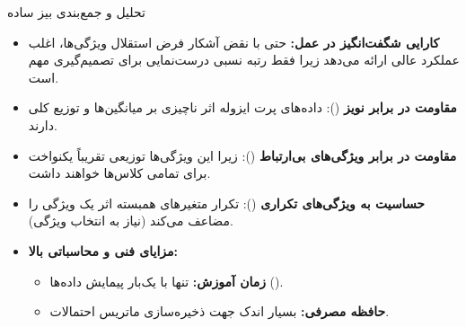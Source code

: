 \begin{frame}{تحلیل و جمع‌بندی بیز ساده}{}
  \begin{itemize}
    \setlength{\itemsep}{7pt}
    \item \textbf{کارایی شگفت‌انگیز در عمل:} حتی با نقض آشکار فرض استقلال ویژگی‌ها، اغلب عملکرد عالی ارائه می‌دهد زیرا فقط رتبه نسبی درست‌نمایی برای تصمیم‌گیری مهم است.
    \item \textbf{مقاومت در برابر نویز} (): داده‌های پرت ایزوله اثر ناچیزی بر میانگین‌ها و توزیع کلی دارند.
    \item \textbf{مقاومت در برابر ویژگی‌های بی‌ارتباط} (): زیرا این ویژگی‌ها توزیعی تقریباً یکنواخت برای تمامی کلاس‌ها خواهند داشت.
    \item \textbf{حساسیت به ویژگی‌های تکراری} (): تکرار متغیرهای همبسته اثر یک ویژگی را مضاعف می‌کند (نیاز به انتخاب ویژگی).
    \item \textbf{مزایای فنی و محاسباتی بالا:}
    \begin{itemize}
      \item \textbf{زمان آموزش:} تنها با یک‌بار پیمایش داده‌ها ().
      \item \textbf{حافظه مصرفی:} بسیار اندک جهت ذخیره‌سازی ماتریس احتمالات.
    \end{itemize}
  \end{itemize}
\end{frame}
